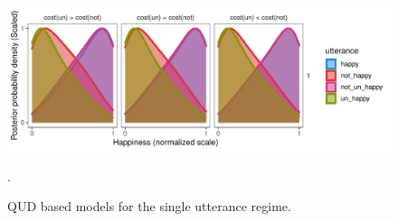 \documentclass[floatsintext,doc]{apa6}
\let\oldparagraph\paragraph
\renewcommand{\paragraph}[1]{\oldparagraph{#1}\mbox{}}
\begin{document}







\begin{figure}[t]
\centering \includegraphics{figs/qudModels.pdf} 
\caption{QUD based models for the single utterance regime.}.\label{fig:qud}
\end{figure}
\end{document}
